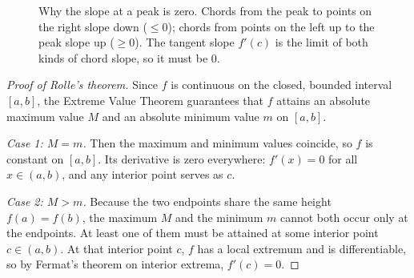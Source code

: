 \begin{figure}[htbp]
\centering
{}
\caption{Why the slope at a peak is zero. Chords from the peak to points on the right
slope down ($\le 0$); chords from points on the left up to the peak slope up
($\ge 0$). The tangent slope $f'(c)$ is the limit of both kinds of chord slope, so it
must be $0$.}
\label{ch15:fig-fermat}
\end{figure}

\begin{proof}[Proof of Rolle's theorem]
Since $f$ is continuous on the closed, bounded interval $[a,b]$, the Extreme Value
Theorem guarantees that $f$ attains an absolute maximum value $M$ and an absolute
minimum value $m$ on $[a,b]$.

\emph{Case 1: $M=m$.} Then the maximum and minimum values coincide, so $f$ is
constant on $[a,b]$. Its derivative is zero everywhere: $f'(x)=0$ for all $x\in(a,b)$,
and any interior point serves as $c$.

\emph{Case 2: $M>m$.} Because the two endpoints share the same height $f(a)=f(b)$,
the maximum $M$ and the minimum $m$ cannot both occur only at
the endpoints. At least one of them must be attained at some interior point
$c\in(a,b)$. At that interior point $c$, $f$ has a local extremum and is
differentiable, so by Fermat's theorem on interior extrema, $f'(c)=0$.
\end{proof}

